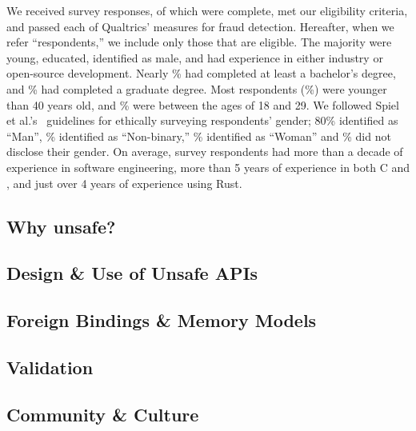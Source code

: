 We received  survey responses, of which  were complete,  met our eligibility criteria, and  passed each of Qualtrics' measures for fraud detection. Hereafter, when we refer ``respondents,'' we include only those that are eligible. The majority were young, educated, identified as male, and had experience in either industry or open-source development. Nearly \degree\% had completed at least a bachelor's degree, and \graduatedegree\% had completed a graduate degree. Most respondents (\belowforty\%) were younger than 40 years old, and \% were between the ages of 18 and 29. We followed Spiel et al.'s~\cite{spiel19_gender} guidelines for ethically surveying respondents' gender; 80\% identified as ``Man'', \% identified as ``Non-binary,'' \% identified as ``Woman'' and \% did not disclose their gender. On average, survey respondents had more than a decade of experience in software engineering, more than 5 years of experience in both C and \CC{}, and just over 4 years of experience using Rust.

\subsection{Why unsafe?}
\label{results:rq1}


\subsection{Design \& Use of Unsafe APIs}
\label{results:rq2}


\subsection{Foreign Bindings \& Memory Models}


\subsection{Validation}


\subsection{Community \& Culture}
